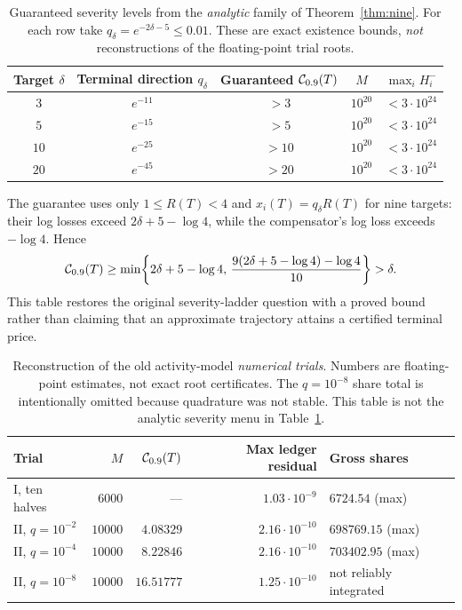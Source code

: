 \documentclass[review,hidelinks,onefignum,onetabnum]{siamonline250211}%
\begin{document}
\begin{table}[tb]
\centering\small
\caption{Guaranteed severity levels from the \emph{analytic} family
of Theorem~\ref{thm:nine}. For each row take
$q_\delta=e^{-2\delta-5}\le0.01$. These are exact existence
bounds, \emph{not} reconstructions of the floating-point trial roots.}
\label{tab:analytic-severity}
\begin{tabular}{@{}ccccc@{}}\toprule
Target $\delta$ & Terminal direction $q_\delta$ & Guaranteed
$\mathcal{C}_{0.9}(T)$ & $M$ & $\max_i H_i^-$ \\\midrule
$3$ & $e^{-11}$ & $>3$ & $10^{20}$ & $<3\cdot10^{24}$\\
$5$ & $e^{-15}$ & $>5$ & $10^{20}$ & $<3\cdot10^{24}$\\
$10$ & $e^{-25}$ & $>10$ & $10^{20}$ & $<3\cdot10^{24}$\\
$20$ & $e^{-45}$ & $>20$ & $10^{20}$ & $<3\cdot10^{24}$\\\bottomrule
\end{tabular}
\end{table}
The guarantee uses only $1\le R(T)<4$ and
$x_i(T)=q_\delta R(T)$ for nine targets: their log losses
exceed $2\delta+5-\log4$, while the compensator's log loss
exceeds $-\log4$. Hence
\[
 \mathcal{C}_{0.9}(T)\ge\min\!\left\{
 2\delta+5-\log4,\,
 \frac{9(2\delta+5-\log4)-\log4}{10}\right\}>\delta.
\]
This table restores the original severity-ladder question with a
proved bound rather than claiming that an approximate trajectory
attains a certified terminal price.

\begin{table}[tb]
\centering\small
\caption{Reconstruction of the old activity-model \emph{numerical trials}.
Numbers are floating-point estimates, not exact root certificates.
The $q=10^{-8}$ share total is intentionally omitted because
quadrature was not stable. This table is not the analytic severity
menu in Table~\ref{tab:analytic-severity}.}
\label{tab:reconstruction}
\begin{tabular}{@{}lrrrl@{}}\toprule
Trial & $M$ & $\mathcal{C}_{0.9}(T)$ & Max ledger residual & Gross shares \\\midrule
I, ten halves & $6000$ & --- & $1.03\cdot10^{-9}$ & $6724.54$ (max)\\
II, $q=10^{-2}$ & $10000$ & $4.08329$ & $2.16\cdot10^{-10}$ & $698769.15$ (max)\\
II, $q=10^{-4}$ & $10000$ & $8.22846$ & $2.16\cdot10^{-10}$ & $703402.95$ (max)\\
II, $q=10^{-8}$ & $10000$ & $16.51777$ & $1.25\cdot10^{-10}$ & not reliably integrated \\\bottomrule
\end{tabular}
\end{table}
\end{document}
